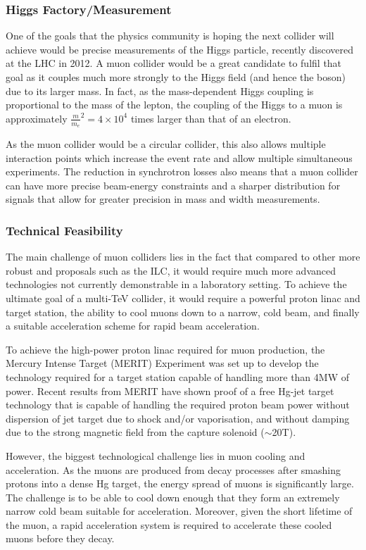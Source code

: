 \subsubsection{Higgs Factory/Measurement}
 
One of the goals that the physics community is hoping the next collider will achieve would be precise measurements of the Higgs particle, recently discovered at the LHC in 2012.  A muon collider would be a great candidate to fulfil that goal as it couples much more strongly to the Higgs field (and hence the boson) due to its larger mass. In fact, as the mass-dependent Higgs coupling is proportional to the mass of the lepton, the coupling of the Higgs to a muon is approximately $\frac{m}{m_e}^2 = 4 \times 10^4$ times larger than that of an electron.
 
As the muon collider would be a circular collider, this also allows multiple interaction points which increase the event rate and allow multiple simultaneous experiments. The reduction in synchrotron losses also means that a muon collider can have more precise beam-energy constraints and a sharper distribution for signals that allow for greater precision in mass and width measurements.

\subsubsection{Technical Feasibility}
 
The main challenge of muon colliders lies in the fact that compared to other more robust and proposals such as the ILC, it would require much more advanced technologies not currently demonstrable in a laboratory setting. To achieve the ultimate goal of a multi-TeV collider, it would require a powerful proton linac and target station, the ability to cool muons down to a narrow, cold beam, and finally a suitable acceleration scheme for rapid beam acceleration.
 
To achieve the high-power proton linac required for muon production, the Mercury Intense Target (MERIT) Experiment was set up to develop the technology required for a target station capable of handling  more than 4MW of power. Recent results from MERIT have shown proof of a free Hg-jet target technology that is capable of handling the required proton beam power without dispersion of jet target due to shock and/or vaporisation, and without damping due to the strong magnetic field from the capture solenoid ($\sim$20T).
 
However, the biggest technological challenge lies in muon cooling and acceleration. As the muons are produced from decay processes after smashing protons into a dense Hg target, the energy spread of muons is significantly large. The challenge is to be able to cool down enough that they form an extremely narrow cold beam suitable for acceleration. Moreover, given the short lifetime of the muon, a rapid acceleration system is required to accelerate these cooled muons before they decay.
 
